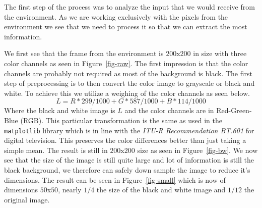 The first step of the process was to analyze the input that we would receive from the environment. As we are working exclusively with the pixels from the environment we see that we need to process it so that we can extract the most information.

\medskip
\noindent
We first see that the frame from the environment is $200$x$200$ in size with three color channels as seen in Figure~\ref{fig-raw}. The first impression is that the color channels are probably not required as most of the background is black. The first step of preprocessing is to then convert the color image to grayscale or black and white. To achieve this we utilize a weighing of the color channels as seen below.   
\[ L = R * 299/1000 + G * 587/1000 + B * 114/1000 \]
Where the black and white image is $L$ and the color channels are in Red-Green-Blue (RGB). This particular transformation is the same as used in the \texttt{matplotlib} library which is in line with the \textit{ITU-R Recommendation BT.601} for digital television. This preserves the color differences better than just taking a simple mean. The result is still in $200$x$200$ size as seen in Figure~\ref{fig-bw}. We now see that the size of the image is still quite large and lot of information is still the black background, we therefore can safely down sample the image to reduce it's dimensions. The result can be seen in Figure~\ref{fig-small} which is now of dimensions $50$x$50$, nearly $1/4$ the size of the black and white image and $1/12$ the original image.

